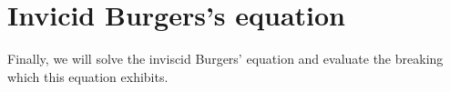 \begin{figure}[ht]
    \centering
    
\end{figure}


%

\begin{figure}[ht]
    \centering
    
\end{figure}

\section{Invicid Burgers's equation}

Finally, we will solve the inviscid Burgers' equation and evaluate the breaking which this equation exhibits. 

\begin{figure}[ht]
    \centering
    
\end{figure}
